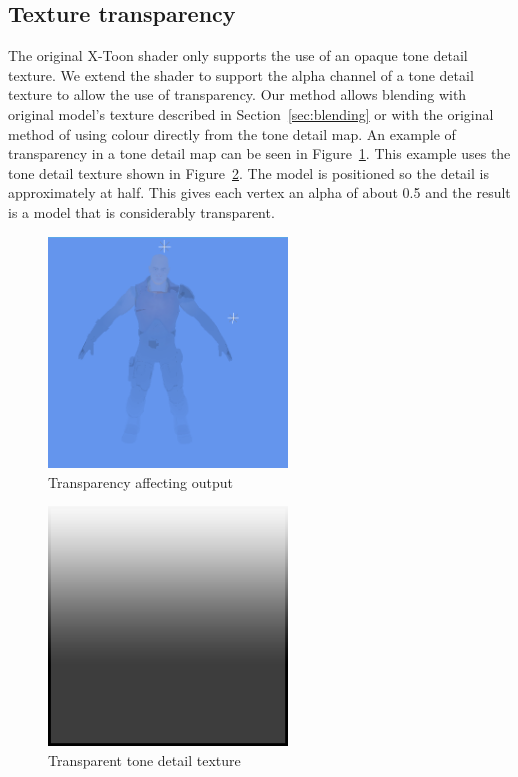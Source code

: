 \documentclass[annual]{acmsiggraph}
\begin{document}
\subsection{Texture transparency}
\label{sec:transparency}
The original X-Toon shader only supports the use of an opaque tone detail texture. We extend the shader to support the alpha channel of a tone detail texture to allow the use of transparency. Our method allows blending with original model's texture described in Section~\ref{sec:blending} or with the original method of using colour directly from the tone detail map. An example of transparency in a tone detail map can be seen in Figure~\ref{fig:transparency}. This example uses the tone detail texture shown in Figure~\ref{fig:transparent_tone}. The model is positioned so the detail is approximately at half. This gives each vertex an alpha of about 0.5 and the result is a model that is considerably transparent.

\begin{figure}[h]
	\centering
	\includegraphics[width=2.5in]{images/transparency}
	\caption{Transparency affecting output}
	\label{fig:transparency}
\end{figure}

\begin{figure}[h]
	\centering
	\includegraphics[width=2.5in]{images/xtoon_shading_alpha}
	\caption{Transparent tone detail texture}
	\label{fig:transparent_tone}
\end{figure}
\end{document}
